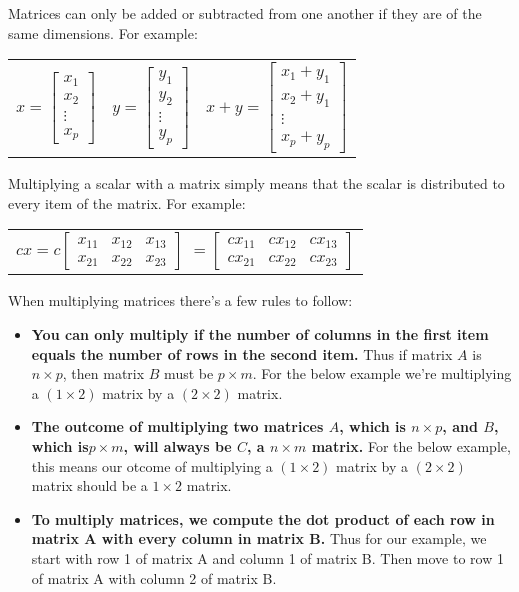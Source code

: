 \documentclass[a4paper]{article}
\begin{document}
Matrices can only be added or subtracted from one another if they are of the same dimensions. For example:
\begin{tabular}{ccc}
  $x=\begin{bmatrix}
    x_1\\
    x_2\\
    \vdots\\
    x_p
  \end{bmatrix}$ &
  $y=\begin{bmatrix}
    y_1\\
    y_2\\
    \vdots\\
    y_p
  \end{bmatrix}$ &
  $x+y=\begin{bmatrix}
    x_1+y_1\\
    x_2+y_1\\
    \vdots\\
    x_p+y_p
  \end{bmatrix}$
\end{tabular}

Multiplying a scalar with a matrix simply means that the scalar is distributed to every item of the matrix. For example:

\begin{tabular}{c}
  $cx=c\begin{bmatrix}
    x_{11} & x_{12} & x_{13}\\
    x_{21} & x_{22} & x_{23}
  \end{bmatrix}$
  $=\begin{bmatrix}
    cx_{11} & cx_{12} & cx_{13}\\
    cx_{21} & cx_{22} & cx_{23}
  \end{bmatrix}$
\end{tabular}

When multiplying matrices there's a few rules to follow:

\begin{itemize}
\item \textbf{You can only multiply if the number of columns in the first item equals the number of rows in the second item.} Thus if matrix $A$ is $n\times p$, then matrix $B$ must be $p\times m$. For the below example we're multiplying a $(1\times2)$ matrix by a $(2\times2)$ matrix.
\item \textbf{The outcome of multiplying two matrices $A$, which is $n\times p$, and  $B$, which is$p\times m$, will always be $C$, a  $n\times m$ matrix.} For the below example, this means our otcome of multiplying a $(1\times2)$ matrix by a $(2\times2)$ matrix should be a $1\times 2$ matrix.
\item \textbf{To multiply matrices, we compute the dot product of each row in matrix A with every column in matrix B.} Thus for our example, we start with row 1 of matrix A and column 1 of matrix B. Then move to row 1 of matrix A with column 2 of matrix B.
\end{itemize}
\end{document}
